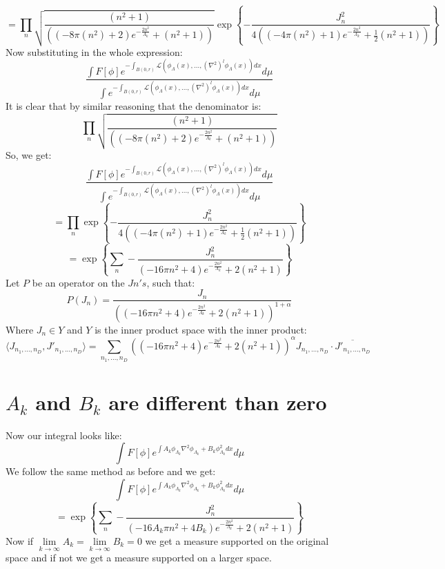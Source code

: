 \documentclass{article}
\theoremstyle{definition}
\begin{document}
\[
=\prod_{n}\sqrt{\frac{\left(n^2+1\right) }{\left(\left(-8\pi(n^2)+2\right) e^{-\frac{2n^2}{\Lambda_k}}+\left(n^2+1\right)\right)}}\exp\left\{-\frac{J_n^2}{4\left(\left(-4\pi(n^2)+1\right) e^{-\frac{2n^2}{\Lambda_k}}+\frac{1}{2}\left(n^2+1\right)\right)}\right\}
\]
Now  substituting in the whole expression:
$$
\frac{\int F[\phi] e^{-\int_{B(0, r)} \mathcal{L}\left(\phi_{\Lambda}(x), \ldots,\left(\nabla^{2}\right)^{l} \phi_{\Lambda}(x)\right) d x} d \mu}{\int e^{-\int_{B(0, r)} \mathcal{L}\left(\phi_{\Lambda}(x), \ldots,\left(\nabla^{2}\right)^{l} \phi_{\Lambda}(x)\right) d x} d \mu}
$$
It is clear that by similar reasoning that the denominator is:
$$\prod_{n}\sqrt{\frac{\left(n^2+1\right) }{\left(\left(-8\pi(n^2)+2\right) e^{-\frac{2n^2}{\Lambda_k}}+\left(n^2+1\right)\right)}}$$
So, we get:
$$
\frac{\int F[\phi] e^{-\int_{B(0, r)} \mathcal{L}\left(\phi_{\Lambda}(x), \ldots,\left(\nabla^{2}\right)^{l} \phi_{\Lambda}(x)\right) d x} d \mu}{\int e^{-\int_{B(0, r)} \mathcal{L}\left(\phi_{\Lambda}(x), \ldots,\left(\nabla^{2}\right)^{l} \phi_{\Lambda}(x)\right) d x} d \mu}
$$
\[
=\prod_{n}\exp\left\{-\frac{J_n^2}{4\left(\left(-4\pi(n^2)+1\right) e^{-\frac{2n^2}{\Lambda_k}}+\frac{1}{2}\left(n^2+1\right)\right)}\right\}
\]
\[
=\exp\left\{\sum_{n} -\frac{J_n^2}{\left(-16\pi n^2+4\right) e^{-\frac{2n^2}{\Lambda_k}}+ 2\left(n^2+1\right)}\right\}
\]
Let $P$ be an operator on the $Jn's$, such that:
\[
P(J_n) = \frac{J_n}{\left(\left(-16\pi n^2+4\right) e^{-\frac{2n^2}{\Lambda_k}}+ 2\left(n^2+1\right)\right)^{1+\alpha}}
\]
Where $J_n \in Y$ and $Y$ is the inner product space with the inner product:
\[
\langle J_{n_1,..., n_D},J'_{n_1,..., n_D} \rangle = \sum_{n_1,..., n_D} \left(\left(-16\pi n^2+4\right) e^{-\frac{2n^2}{\Lambda_k}}+ 2\left(n^2+1\right)\right)^{\alpha} J_{n_1,..., n_D} \cdot \overline{J'_{n_1,..., n_D}}
\]
\section{$A_k$ and $B_k$ are different than zero}
Now our integral looks like:
$$\int F[\phi]e^{\int A_k \phi_{\Lambda_k} \nabla^2 \phi_{\Lambda_k} + B_k\phi_{\Lambda_k}^2 dx}d\mu$$
We follow the same method as before and we get:
\[
\int F[\phi]e^{\int A_k \phi_{\Lambda_k} \nabla^2 \phi_{\Lambda_k} + B_k\phi_{\Lambda_k}^2 dx}d\mu
\]
\[
=\exp\left\{\sum_{n} -\frac{J_n^2}{\left(-16 A_k \pi n^2+4 B_k \right) e^{-\frac{2n^2}{\Lambda_k}}+ 2\left(n^2+1\right)}\right\}
\]
Now if $\lim\limits_{{k \to \infty}} A_k = \lim\limits_{{k \to \infty}} B_k = 0
$ we get a measure supported on the original space and if not we get a measure supported on a larger space.
\end{document}
